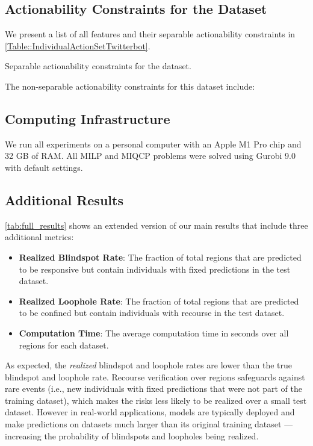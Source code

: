 \clearpage
\subsection{Actionability Constraints for the  Dataset} 

We present a list of all features and their separable actionability constraints in \cref{Table::IndividualActionSetTwitterbot}.
\begin{table}[!h]
\centering
\fontsize{9pt}{9pt}\selectfont
\resizebox{0.75\linewidth}{!}{}
\caption{Separable actionability constraints for the  dataset.}
\label{Table::IndividualActionSetTwitterbot}
\end{table}

The non-separable actionability constraints for this dataset include:


\subsection{Computing Infrastructure}
We run all experiments on a personal computer with an Apple M1 Pro chip and 32 GB of RAM. All MILP and MIQCP problems were solved using Gurobi 9.0 \cite{achterberg2019gurobi} with default settings.



\subsection{Additional Results}
\cref{tab:full_results} shows an extended version of our main results that include three additional metrics:
\begin{itemize}
    \item \textbf{Realized Blindspot Rate}: The fraction of total regions that are predicted to be responsive but contain individuals with fixed predictions in the test dataset.
    \item \textbf{Realized Loophole Rate}: The fraction of total regions that are predicted to be confined but contain individuals with recourse in the test dataset.
    \item \textbf{Computation Time}: The average computation time in seconds over all regions for each dataset.
\end{itemize}

As expected, the \emph{realized} blindspot and loophole rates are lower than the true blindspot and loophole rate. Recourse verification over regions safeguards against rare events (i.e., new individuals with fixed predictions that were not part of the training dataset), which makes the risks less likely to be realized over a small test dataset. However in real-world applications, models are typically deployed and make predictions on datasets much larger than its original training dataset --- increasing the probability of blindspots and loopholes being realized. 

